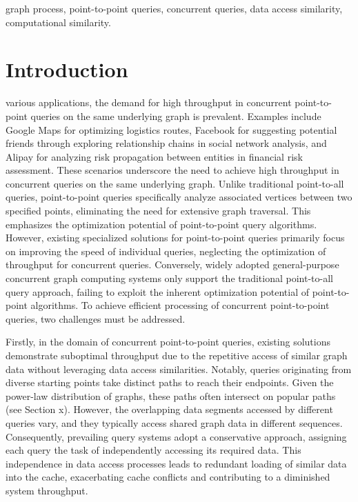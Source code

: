 \documentclass[lettersize,journal]{IEEEtran} %
\begin{document}
\begin{IEEEkeywords}
graph process, point-to-point queries, concurrent queries, data access similarity, computational similarity.
\end{IEEEkeywords}


\section{Introduction}

 various applications, the demand for high throughput in concurrent point-to-point queries on the same underlying graph is prevalent. Examples include Google Maps\cite{google} for optimizing logistics routes, Facebook\cite{facebook} for suggesting potential friends through exploring relationship chains in social network analysis, and Alipay\cite{alipay} for analyzing risk propagation between entities in financial risk assessment. These scenarios underscore the need to achieve high throughput in concurrent queries on the same underlying graph. Unlike traditional point-to-all queries, point-to-point queries specifically analyze associated vertices between two specified points, eliminating the need for extensive graph traversal. This emphasizes the optimization potential of point-to-point query algorithms. However, existing specialized solutions for point-to-point queries\cite{pnp}\cite{tripoline}\cite{sgraph} primarily focus on improving the speed of individual queries, neglecting the optimization of throughput for concurrent queries. Conversely, widely adopted general-purpose concurrent graph computing systems\cite{glign} only support the traditional point-to-all query approach, failing to exploit the inherent optimization potential of point-to-point algorithms. To achieve efficient processing of concurrent point-to-point queries, two challenges must be addressed.

Firstly, in the domain of concurrent point-to-point queries, existing solutions demonstrate suboptimal throughput due to the repetitive access of similar graph data without leveraging data access similarities. Notably, queries originating from diverse starting points take distinct paths to reach their endpoints. Given the power-law distribution of graphs, these paths often intersect on popular paths (see Section x). However, the overlapping data segments accessed by different queries vary, and they typically access shared graph data in different sequences. Consequently, prevailing query systems adopt a conservative approach, assigning each query the task of independently accessing its required data. This independence in data access processes leads to redundant loading of similar data into the cache, exacerbating cache conflicts and contributing to a diminished system throughput.
\end{document}
